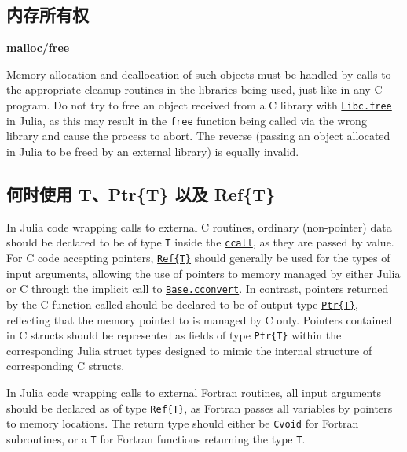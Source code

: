 \hypertarget{10794774929021837783}{}


\subsection{内存所有权}



\textbf{malloc/free}



Memory allocation and deallocation of such objects must be handled by calls to the appropriate cleanup routines in the libraries being used, just like in any C program. Do not try to free an object received from a C library with \hyperlink{1633533624062187737}{\texttt{Libc.free}} in Julia, as this may result in the \texttt{free} function being called via the wrong library and cause the process to abort. The reverse (passing an object allocated in Julia to be freed by an external library) is equally invalid.



\hypertarget{13734604265364549635}{}


\subsection{何时使用 T、Ptr\{T\} 以及 Ref\{T\}}



In Julia code wrapping calls to external C routines, ordinary (non-pointer) data should be declared to be of type \texttt{T} inside the \hyperlink{14245046751182637566}{\texttt{ccall}}, as they are passed by value.  For C code accepting pointers, \hyperlink{7936024700322877457}{\texttt{Ref\{T\}}} should generally be used for the types of input arguments, allowing the use of pointers to memory managed by either Julia or C through the implicit call to \hyperlink{16487788729383051927}{\texttt{Base.cconvert}}. In contrast, pointers returned by the C function called should be declared to be of output type \hyperlink{10630331440513004826}{\texttt{Ptr\{T\}}}, reflecting that the memory pointed to is managed by C only. Pointers contained in C structs should be represented as fields of type \texttt{Ptr\{T\}} within the corresponding Julia struct types designed to mimic the internal structure of corresponding C structs.



In Julia code wrapping calls to external Fortran routines, all input arguments should be declared as of type \texttt{Ref\{T\}}, as Fortran passes all variables by pointers to memory locations. The return type should either be \texttt{Cvoid} for Fortran subroutines, or a \texttt{T} for Fortran functions returning the type \texttt{T}.



